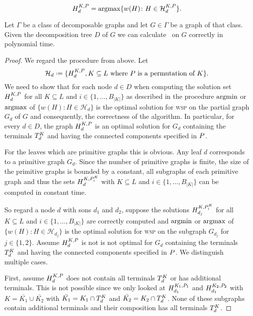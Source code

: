 $$H_{d}^{K,P} = \operatorname*{argmax} \{w(H) \colon H \in \mathcal{H}_d^{K,P} \}.$$

\begin{theorem}
	\label{thm:dyndecomposable}
	Let $\Gamma$ be a class of decomposable graphs and let $G \in \Gamma$ be a graph of that class. Given the decomposition tree $D$ of $G$ we can calculate \WSP\ on $G$ correctly in polynomial time.
\end{theorem}

\begin{proof}
	We regard the procedure from above. Let 
	$$\mathcal{H}_d \defeq \{ \HSSP{d}{K,P}, K \subseteq L \text{ where } P \allowdisplaybreaks \text{ is a permutation of } \allowdisplaybreaks K \}.$$
	We need to show that for each node $d \in D$ when computing the solution set $H_{d}^{K,P}$ for all $K \subseteq L$ and $i\in \{1,\ldots,B_{|K|}\}$ as described in the procedure $\operatorname*{argmin}$ or $\operatorname*{argmax}$ of $\{ w(H) \colon H \in \mathcal{H}_d \}$ is the optimal solution for \textsc{wsp} on the partial graph $G_d$ of $G$ and consequently, the correctness of the algorithm. In particular, for every $d \in D$, the graph $H_{d}^{K,P}$ is an optimal solution for $G_d$ containing the terminals $T_{d}^{K}$ and having the connected components specified in $P_{}^{}$.\medskip
	
	For the leaves which are primitive graphs this is obvious. Any leaf $d$ corresponds to a primitive graph $G_d$. Since the number of primitive graphs is finite, the size of the primitive graphs is bounded by a constant, all subgraphs of each primitive graph and thus the sets $H_{d}^{K,P^K_i}$ with $K \subseteq L$ and $i\in \{1,\ldots,B_{|K|}\}$ can be computed in constant time.\medskip
	
	So regard a node $d$ with sons $d_1$ and $d_2$, suppose the solutions $H_{d_j}^{K,P^K_i}$ for all $K \subseteq L$ and $i\in \{1,\ldots,B_{|K|}\}$ are correctly computed and $\operatorname*{argmin}$ or $\operatorname*{argmax}$ of $\{ w(H) \colon H \in \mathcal{H}_{d_j} \}$ is the optimal solution for \textsc{wsp} on the subgraph $G_{d_j}$ for $j \in \{1, 2\}$. Assume $H_{d}^{K,P}$ is not is not optimal for $G_d$ containing the terminals $T_{d}^{K}$ and having the connected components specified in $P_{}^{}$. We distinguish multiple cases.\medskip
	
	First, assume $H_{d}^{K,P}$ does not contain all terminals $T_{d}^{K}$ or has additional terminals. This is not possible since we only looked at $H_{d_1}^{K_1,P_1}$ and $H_{d_1}^{K_2,P_2}$ with $K = \bar{K_1} \cup \bar{K_2}$ with $\bar{K_1} = K_1 \cap T_{d}^{K}$ and $\bar{K_2} = K_2 \cap T_{d}^{K}$. None of these subgraphs contain additional terminals and their composition has all terminals $T_{d}^{K}$.\medskip
	

\end{proof}
